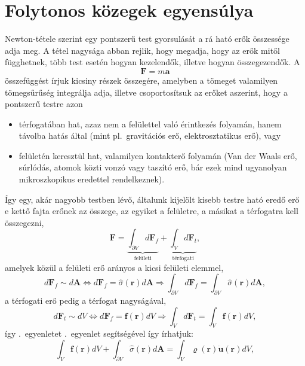 \documentclass[12pt,a4paper]{scrartcl}
\let\mathbf\bm
\begin{document}
\section{Folytonos közegek egyensúlya}
Newton-tétele szerint egy pontszerű test gyorsulását a rá ható erők összessége adja meg. A tétel nagysága abban rejlik, hogy megadja, hogy az erők mitől függhetnek, több test esetén hogyan kezelendők, illetve hogyan összegezendők. A
\begin{equation} \label{eq:newton}
{\mathbf{F}} = m{\mathbf{a}}
\end{equation}
összefüggést írjuk kicsiny részek összegére, amelyben a tömeget valamilyen tömegsűrűség integrálja adja, illetve csoportosítsuk az erőket aszerint, hogy a pontszerű testre azon
\begin{itemize}
\item térfogatában hat, azaz nem a felülettel való érintkezés folyamán, hanem távolba hatás által (mint pl.\ gravitációs erő, elektrosztatikus erő), vagy
\item felületén keresztül hat, valamilyen kontakterő folyamán (Van der Waals erő, súrlódás, atomok közti vonzó vagy taszító erő, bár ezek mind ugyanolyan mikroszkopikus eredettel rendelkeznek).
\end{itemize}
Így egy, akár nagyobb testben lévő, általunk kijelölt kisebb testre ható eredő erő e kettő fajta erőnek az összege, az egyiket a felületre, a másikat a térfogatra kell összegezni,
\begin{equation} \label{eq:erok_csop}
{\mathbf{F}} = \underbrace {\int_{\partial V} {d{{\mathbf{F}}_f}} }_{{\text{felületi}}} + \underbrace {\int_V {d{{\mathbf{F}}_t}} }_{\text{térfogati}},
\end{equation}
amelyek közül a felületi erő arányos a kicsi felületi elemmel,
\[d{{\mathbf{F}}_f} \sim d{\mathbf{A}} \Leftrightarrow d{{\mathbf{F}}_f} = \hat \sigma \left( {\mathbf{r}} \right)d{\mathbf{A}} \Rightarrow \int_{\partial V} {d{{\mathbf{F}}_f}}  = \int_{\partial V} {\hat \sigma \left( {\mathbf{r}} \right)d{\mathbf{A}}},\]
a térfogati erő pedig a térfogat nagyságával,
\[d{{\mathbf{F}}_t} \sim dV \Leftrightarrow d{{\mathbf{F}}_f} = {\mathbf{f}}\left( {\mathbf{r}} \right)dV \Rightarrow \int_V {d{{\mathbf{F}}_t}}  = \int_V {{\mathbf{f}}\left( {\mathbf{r}} \right)dV},\]
így \az{\eqref{eq:newton}}.\ egyenletet \az{\eqref{eq:erok_csop}}.\ egyenlet segítségével így írhatjuk:
\[\int_V {{\mathbf{f}}\left( {\mathbf{r}} \right)dV}  + \int_{\partial V} {\hat \sigma \left( {\mathbf{r}} \right)d{\mathbf{A}}}  = \int_V {\varrho \left( {\mathbf{r}} \right){\mathbf{\ddot u\left({\mathbf{r}}\right)}}dV} ,\]
\end{document}
